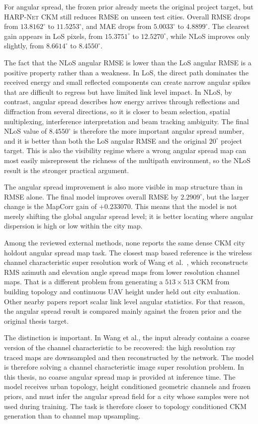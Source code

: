 For angular spread, the frozen prior already meets the original project target,
but \textsc{HARP-Net CKM} still reduces RMSE on unseen test cities. Overall
RMSE drops from \(13.8162^\circ\) to \(11.5253^\circ\), and MAE drops from
\(5.0033^\circ\) to \(4.8899^\circ\). The clearest gain appears in LoS
pixels, from \(15.3751^\circ\) to \(12.5270^\circ\), while NLoS improves only
slightly, from \(8.6614^\circ\) to \(8.4550^\circ\).

The fact that the NLoS angular RMSE is lower than the LoS angular RMSE is a
positive property rather than a weakness. In LoS, the direct path dominates the
received energy and small reflected components can create narrow angular spikes
that are difficult to regress but have limited link level impact. In NLoS, by
contrast, angular spread describes how energy arrives through reflections and
diffraction from several directions, so it is closer to beam selection,
spatial multiplexing, interference interpretation and beam tracking ambiguity.
The final NLoS value of \(8.4550^\circ\) is therefore the more important angular
spread number, and it is better than both the LoS angular RMSE and the original
\(20^\circ\) project target. This is also the visibility regime where a wrong
angular spread map can most easily misrepresent the richness of the multipath
environment, so the NLoS result is the stronger practical argument.

The angular spread improvement is also more visible in map structure than in
RMSE alone. The final model improves overall RMSE by \(2.2909^\circ\), but the
larger change is the MapCorr gain of \(+0.233070\). This means that the model
is not merely shifting the global angular spread level; it is better locating
where angular dispersion is high or low within the city map.

Among the reviewed external methods, none reports the same dense CKM city
holdout angular spread map task. The closest map based reference is the
wireless channel characteristic super resolution work of Wang et al.\
\cite{wang2023multitasksr}, which reconstructs RMS azimuth and elevation
angle spread maps from lower resolution channel maps. That is a different
problem from generating a \(513\times513\) CKM from building topology and
continuous UAV height under held out city evaluation. Other nearby papers
report scalar link level angular statistics. For that reason, the angular
spread result is compared mainly against the frozen prior and the original
thesis target.

The distinction is important. In Wang et al., the input already contains a
coarse version of the channel characteristic to be recovered: the high
resolution ray traced maps are downsampled and then reconstructed by the
network. The model is therefore solving a channel characteristic image
super resolution problem. In this thesis, no coarse angular spread map is
provided at inference time. The model receives urban topology, height
conditioned geometric channels and frozen priors, and must infer the angular
spread field for a city whose samples were not used during training. The task
is therefore closer to topology conditioned CKM generation than to channel map
upsampling.

